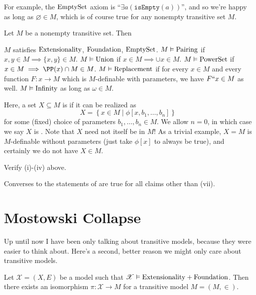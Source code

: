 For example, the $\mathrm{EmptySet}$ axiom is ``$\exists a (\mathtt{isEmpty}(a))$'',
and so we're happy as long as $\varnothing \in M$, which is of course
true for any nonempty transitive set $M$.

\begin{lemma}
	\label{lem:transitive_ZFC}
	Let $M$ be a nonempty transitive set. Then
	\begin{enumerate}[(i)]
		\ii $M$ satisfies $\mathrm{Extensionality}$, $\mathrm{Foundation}$, $\mathrm{EmptySet}$.
		\ii $M \vDash \mathrm{Pairing}$ if $x,y \in M \implies \{x,y\} \in M$.
		\ii $M \vDash \mathrm{Union}$ if $x \in M \implies \cup x \in M$.
		\ii $M \vDash \mathrm{PowerSet}$ if $x \in M \implies \PP(x) \cap M \in M$.
		\ii $M \vDash \mathrm{Replacement}$ if for every $x \in M$
		and every function $F : x \to M$
		which is $M$-definable with parameters,
		we have $F``x \in M$ as well.
		\ii $M \vDash \mathrm{Infinity}$ as long as $\omega \in M$.
	\end{enumerate}
\end{lemma}
Here, a set $X \subseteq M$ is 
if it can be realized as
\[ X = \left\{ x \in M \mid \phi[x, b_1, \dots, b_n] \right\} \]
for some (fixed) choice of parameters $b_1,\dots,b_n \in M$.
We allow $n=0$, in which case we say $X$ is .
Note that $X$ need not itself be in $M$!
As a trivial example, $X = M$ is $M$-definable without parameters
(just take $\phi[x]$ to always be true), and certainly we do not have $X \in M$.
\begin{exercise}
	Verify (i)-(iv) above.
\end{exercise}
\begin{remark}
	Converses to the statements of 
	are true for all claims other than (vii).
\end{remark}

\section{Mostowski Collapse}
Up until now I have been only talking about transitive models,
because they were easier to think about.
Here's a second, better reason we might only care about transitive models.

\begin{lemma}
	Let $\mathscr X = (X,E)$ be a model
	such that $\mathscr X \vDash \mathrm{Extensionality} + \mathrm{Foundation}$.
	Then there exists an isomorphism $\pi : \mathscr X \to M$ for
	a transitive model $M = (M,\in)$.
\end{lemma}

